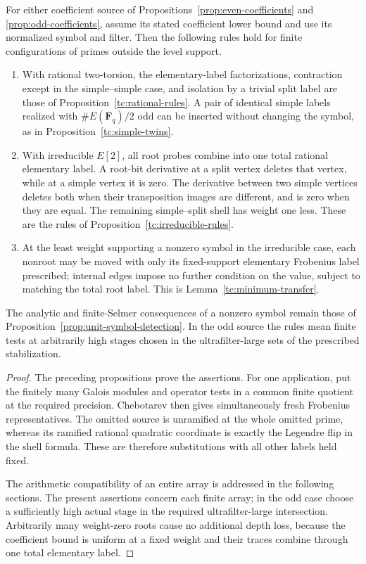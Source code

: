 \begin{theorem}
\label{thm:symbol-rules}\label{co:symbol-interface}
For either coefficient source of
Propositions~\ref{prop:even-coefficients} and
\ref{prop:odd-coefficients}, assume its stated coefficient
lower bound and use its normalized symbol and filter.
Then the following rules hold for finite configurations of
primes outside the level support.
\begin{enumerate}[label=\textup{(\roman*)}]
\item With rational two-torsion, the elementary-label
factorizations, contraction except in the simple--simple
case, and isolation by a trivial split label are those of
Proposition~\ref{tc:rational-rules}.  A pair of identical
simple labels realized with $\#E(\mathbf F_q)/2$ odd can be
inserted without changing the symbol, as in
Proposition~\ref{tc:simple-twins}.
\item With irreducible $E[2]$, all root probes combine into
one total rational elementary label.  A root-bit derivative
at a split vertex deletes that vertex, while at a simple
vertex it is zero.  The derivative between two simple
vertices deletes both when their transposition images are
different, and is zero when they are equal.  The remaining
simple--split shell has weight one less.  These are the
rules of Proposition~\ref{tc:irreducible-rules}.
\item At the least weight supporting a nonzero symbol in
the irreducible case, each nonroot may be moved with only
its fixed-support elementary Frobenius label prescribed;
internal edges impose no further condition on the value,
subject to matching the total root label.  This is
Lemma~\ref{tc:minimum-transfer}.
\end{enumerate}
The analytic and finite-Selmer consequences of a nonzero
symbol remain those of
Proposition~\ref{prop:unit-symbol-detection}.  In the odd
source the rules mean finite tests at arbitrarily high stages
chosen in the ultrafilter-large sets of the prescribed stabilization.
\end{theorem}

\begin{proof}
The preceding propositions prove the assertions. For one application,
put the finitely many Galois modules and operator tests in a common
finite quotient at the required precision. Chebotarev then gives
simultaneously fresh Frobenius representatives. The omitted source is
unramified at the whole omitted prime, whereas its ramified rational
quadratic coordinate is exactly the Legendre flip in the shell formula.
These are therefore substitutions with all other labels held fixed.

The arithmetic compatibility of an entire array is addressed in the
following sections. The present assertions concern each finite array;
in the odd case choose a sufficiently high actual stage in the
required ultrafilter-large intersection. Arbitrarily many weight-zero roots cause no additional depth
loss, because the coefficient bound is uniform at a fixed weight and
their traces combine through one total elementary label.

\end{proof}
